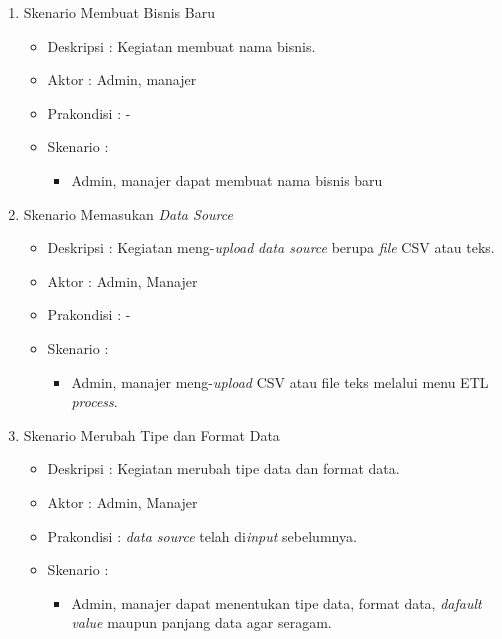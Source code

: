\begin{enumerate}
	\item Skenario Membuat Bisnis Baru \\
	{\renewcommand\labelitemi{}
		\begin{itemize}
			\item Deskripsi		: Kegiatan membuat nama bisnis.
			\item Aktor				: Admin, manajer
			\item Prakondisi	: -
			\item Skenario		:
				\begin{itemize}
					\item Admin, manajer dapat membuat nama bisnis baru 
				\end{itemize}
		\end{itemize}
		}
		
	\item Skenario Memasukan \textit{Data Source}
	{\renewcommand\labelitemi{}
	\begin{itemize}
			\item Deskripsi		: Kegiatan meng-\textit{upload} \textit{data source} berupa \textit{file} CSV atau teks.
			\item Aktor				: Admin, Manajer
			\item Prakondisi	: -
			\item Skenario		:
				\begin{itemize}
					\item Admin, manajer meng-\textit{upload} CSV atau file teks melalui menu ETL \textit{process}. 
				\end{itemize}
		\end{itemize}
		}
		
		\item Skenario Merubah Tipe dan Format Data
		{\renewcommand\labelitemi{}
		\begin{itemize}
			\item Deskripsi		: Kegiatan merubah tipe data dan format data.
			\item Aktor				: Admin, Manajer 
			\item Prakondisi	: \textit{data source} telah di\textit{input} sebelumnya.
			\item Skenario		:
				\begin{itemize}
					\item Admin, manajer dapat menentukan tipe data, format data, \textit{dafault value} maupun panjang data agar seragam.
				\end{itemize}
		\end{itemize}
		}
		

\end{enumerate}

